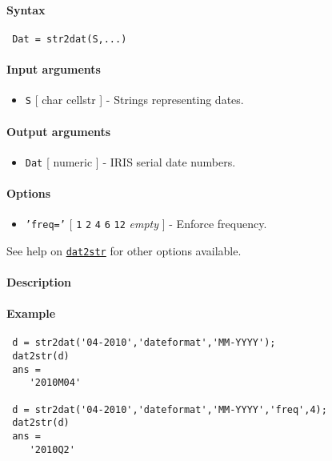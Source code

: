 


	\paragraph{Syntax}
 
 \begin{verbatim}
 Dat = str2dat(S,...)
 \end{verbatim}
 
 \paragraph{Input arguments}
 
 \begin{itemize}
 \item
   \texttt{S} {[} char \textbar{} cellstr {]} - Strings representing
   dates.
 \end{itemize}
 
 \paragraph{Output arguments}
 
 \begin{itemize}
 \item
   \texttt{Dat} {[} numeric {]} - IRIS serial date numbers.
 \end{itemize}
 
 \paragraph{Options}
 
 \begin{itemize}
 \item
   \texttt{'freq='} {[} \texttt{1} \textbar{} \texttt{2} \textbar{}
   \texttt{4} \textbar{} \texttt{6} \textbar{} \texttt{12} \textbar{}
   \emph{empty} {]} - Enforce frequency.
 \end{itemize}
 
 See help on \href{dates/dat2str}{\texttt{dat2str}} for other options
 available.
 
 \paragraph{Description}
 
 \paragraph{Example}
 
 \begin{verbatim}
 d = str2dat('04-2010','dateformat','MM-YYYY');
 dat2str(d)
 ans =
    '2010M04'
 
 d = str2dat('04-2010','dateformat','MM-YYYY','freq',4);
 dat2str(d)
 ans =
    '2010Q2'
 \end{verbatim}


